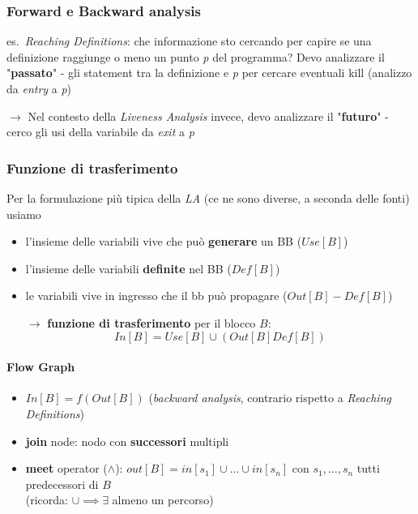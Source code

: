 \subsubsection{Forward e Backward analysis}

es.~\textit{Reaching Definitions}: che informazione sto cercando per capire se una definizione raggiunge o meno un punto \textit{p} del programma? Devo analizzare il "\textbf{passato}" - gli statement tra la definizione e \textit{p} per cercare eventuali kill (analizzo da \textit{entry} a \textit{p})

\noindent $\rightarrow$ Nel contesto della \textit{Liveness Analysis} invece, devo analizzare il "\textbf{futuro}" - cerco gli usi della variabile da \textit{exit} a \textit{p}

\subsubsection{Funzione di trasferimento}

Per la formulazione pi\`u tipica della \textit{LA} (ce ne sono diverse, a seconda delle fonti) usiamo
\begin{itemize}
  \item l'insieme delle variabili vive che pu\`o \textbf{generare} un BB ($Use[B]$)
  \item l'insieme delle variabili \textbf{definite} nel BB ($Def[B]$)
  \item le variabili vive in ingresso che il bb pu\`o propagare ($Out[B] - Def[B]$)
  \item[$\rightarrow$] \textbf{funzione di trasferimento} per il blocco $B$:
  \begin{equation*}
    In[B] = Use[B] \cup (Out[B] Def[B]) 
  \end{equation*}
\end{itemize}

\paragraph{Flow Graph}

\begin{itemize}
  \item $In[B] = f(Out[B])$ (\textit{backward analysis}, contrario rispetto a \textit{Reaching Definitions})
  \item \textbf{join} node: nodo con \textbf{successori} multipli
  \item \textbf{meet} operator ($\wedge$): $out[B] = in[s_1] \cup \ldots \cup in[s_n]$ con $s_1,\ldots,s_n$ tutti predecessori di $B$\\
    (ricorda: $\cup \implies \exists$ almeno un percorso)
\end{itemize}

